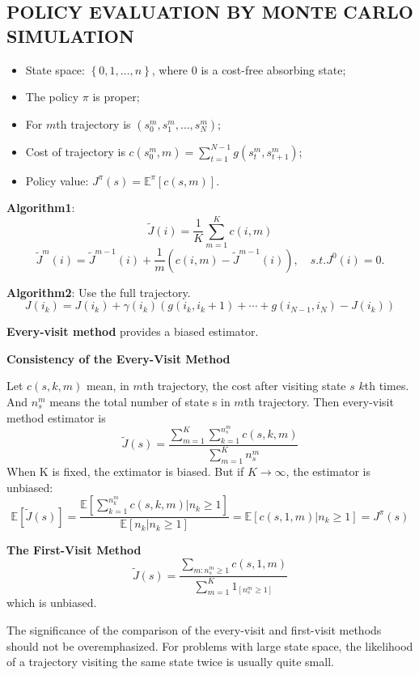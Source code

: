 \subsection{POLICY EVALUATION BY MONTE CARLO SIMULATION}%

\begin{itemize}
    \item State space: $ \left\{ 0, 1, \ldots, n \right\} $, where 0 is a cost-free absorbing state;
    \item The policy $ \pi $ is proper;
    \item For $ m $th trajectory is $ (s^m_0, s^m_1, \ldots, s^m_N) $;
    \item Cost of trajectory is $ c(s^m_0, m) = \sum^{N-1}_{t=1} g(s^m_t, s^m_{t+1}) $;
    \item Policy value: $ J^{\pi}(s) = \mathbb{E}^{\pi}\left[ c(s, m) \right] $.
\end{itemize}

\textbf{Algorithm1}:
\[
    \tilde J(i) = \frac{1}{K} \sum^{K}_{m=1} c(i,m)
\]
\[
    \tilde J^m(i) = \tilde J^{m-1}(i) + \frac{1}{m} (c(i,m) - \tilde J^{m-1}(i)), \quad s.t. J^{0}(i) = 0.
\]

\textbf{Algorithm2}:
Use the full trajectory.
\[
    J(i_k) = J(i_k) + \gamma(i_k) (g(i_k, i_k+1) + \cdots + g(i_{N-1}, i_N) - J(i_k))
\]

\textbf{Every-visit method} provides a biased estimator.

\textbf{Consistency of the Every-Visit Method}

Let $ c(s, k, m) $ mean, in $ m $th trajectory, the cost after visiting state $ s $ $ k $th times. And $ n^m_s $ means the total number of state s in $ m $th trajectory. Then every-visit method estimator is
\[
    \tilde J(s) = \frac{ \sum^{K}_{m=1} \sum^{n^m_s}_{k = 1} c(s, k, m) }{ \sum^{K}_{m=1} n^m_s} 
\]
When K is fixed, the extimator is biased. But if $ K \rightarrow \infty $, the estimator is unbiased:
\[
    \mathbb{E} \left[ \tilde J(s) \right] = \frac{\mathbb{E}\left[ \sum^{n^m_k}_{k = 1} c(s, k, m) | n_k \ge 1  \right]}{ \mathbb{E} \left[ n_k | n_k \ge 1 \right]} = \mathbb{E}\left[ c(s, 1, m) | n_k \ge 1 \right] = J^{\pi}(s)
\]

\textbf{The First-Visit Method}
\[
    \tilde J (s) = \frac{ \sum^{}_{m:n^m_s \ge 1} c(s, 1, m) }{ \sum^{K}_{m = 1} 1_{\left[ n^{m}_{s} \ge 1 \right]} } 
\]
which is unbiased.

The significance of the comparison of the every-visit and first-visit methods should not be overemphasized. For problems with large state space, the likelihood of a trajectory visiting the same state twice is usually quite small.

